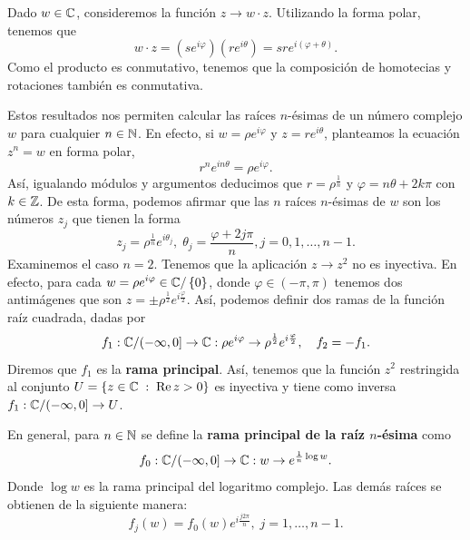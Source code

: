 \begin{observation}
Dado $\displaystyle w \in \mathbb{C} $, consideremos la función $\displaystyle z \to w \cdot z $. Utilizando la forma polar, tenemos que 
\[w \cdot z = \left(s e^{i\varphi}\right)\left(re^{i\theta }\right)=sre^{i\left(\varphi+\theta \right)} .\]
Como el producto es conmutativo, tenemos que la composición de homotecias y rotaciones también es conmutativa.
\end{observation}
Estos resultados nos permiten calcular las raíces $\displaystyle n $-ésimas de un número complejo $\displaystyle w $ para cualquier $\displaystyle n \in \mathbb{N} $. En efecto, si $\displaystyle w = \rho e^{i\varphi} $ y $\displaystyle z = re^{i\theta} $, planteamos la ecuación $\displaystyle z^{n}= w $ en forma polar,
\[r^{n}e^{in\theta}=\rho e^{i\varphi} .\]
Así, igualando módulos y argumentos deducimos que $\displaystyle r = \rho^{\frac{1}{n}} $ y $\displaystyle \varphi = n\theta + 2k\pi  $ con $\displaystyle k \in \mathbb{Z} $. De esta forma, podemos afirmar que las $\displaystyle n $ raíces $\displaystyle n $-ésimas de $\displaystyle w $ son los números $\displaystyle z_{j} $ que tienen la forma
\[z_{j}=\rho^{\frac{1}{n}}e^{i\theta_{j}}, \; \theta_{j}=\frac{\varphi + 2j\pi }{n}, j = 0, 1, \ldots, n-1 .\]
Examinemos el caso $\displaystyle n = 2 $. Tenemos que la aplicación $\displaystyle z \to z^{2} $ no es inyectiva. En efecto, para cada $\displaystyle w = \rho e^{i\varphi} \in \mathbb{C} / \left\{ 0\right\}  $, donde $\displaystyle \varphi \in \left(-\pi, \pi \right) $ tenemos dos antimágenes que son $\displaystyle z = \pm\rho^{\frac{1}{2}}e^{i\frac{\varphi}{2}} $. 
Así, podemos definir dos ramas de la función raíz cuadrada, dadas por 
\[f_{1} : \mathbb{C} / (-\infty,0] \to \mathbb{C} : \rho e^{i\varphi} \to \rho^{\frac{1}{2}}e^{i\frac{\varphi}{2}}, \quad f_{2}=-f_{1} .\]
Diremos que $\displaystyle f_{1} $ es la \textbf{rama principal}. Así, tenemos que la función $\displaystyle z^{2} $ restringida al conjunto $\displaystyle U = \left\{ z \in \mathbb{C} \; : \; \operatorname{Re} z > 0\right\}  $ es inyectiva y tiene como inversa $\displaystyle f_{1} : \mathbb{C}/(-\infty,0] \to U $. 
\begin{definition}
En general, para $\displaystyle n \in \mathbb{N} $ se define la \textbf{rama principal de la raíz $\displaystyle n $-ésima} como
\[f_{0} : \mathbb{C} / (-\infty, 0] \to \mathbb{C} : w \to e^{\frac{1}{n}\log w} .\]
Donde $\displaystyle \log w $ es la rama principal del logaritmo complejo. Las demás raíces se obtienen de la siguiente manera:
\[f_{j}\left(w\right)=f_{0}\left(w\right)e^{i\frac{j2\pi }{n}}, \; j = 1, \ldots, n-1 .\]
\end{definition}
